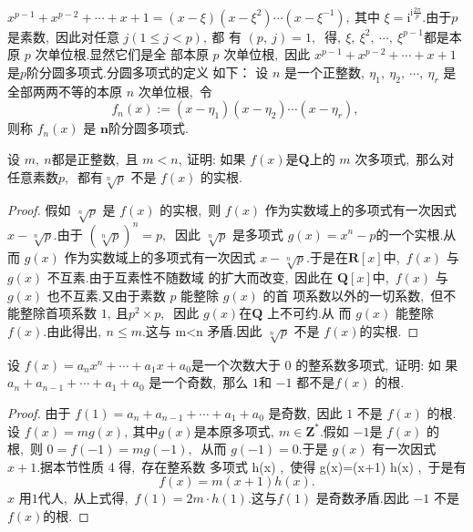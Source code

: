\begin{note}
	$x^{p-1}+x^{p-2}+\cdots+   x+1=(x-\xi)\left(x-\xi^{2}\right) \cdots\left(x-\xi^{-1}\right) ,\  $其中  $\xi=\mathrm{i}^{\mathrm{i} \frac{2 \pi}{p}}  .$由于$  p$  是素数,\  因此对任意 $ j(1 \leqslant j<p) ,\  $都 有 $ (p,\  j)=1 ,\  $ 得$,\   \xi,\  \xi^{2},\  \cdots,\  \xi^{p-1}  $都是本原 $ p$  次单位根.显然它们是全 部本原 $ p $ 次单位根,\  因此  $x^{p-1}+x^{p-2}+\cdots+x+1  $是$  p  $阶分圆多项式.分圆多项式的定义 如下：
	设 $ n$  是一个正整数$,\   \eta_{1},\  \eta_{2},\  \cdots,\  \eta_{r} $ 是全部两两不等的本原  $n $ 次单位根,\  令
	$$f_{n}(x):=\left(x-\eta_{1}\right)\left(x-\eta_{2}\right) \cdots\left(x-\eta_{r}\right),\ $$
	则称 $ f_{n}(x) $ 是 $ \boldsymbol{n}  $阶分圆多项式.
\end{note}
\newpage
\begin{problem}
	设 $ m,\  n  $都是正整数,\  且 $ m<n ,\  $证明: 如果  $f(x)  $是$  \mathbf{Q}  $上的  $m $ 次多项式,\  那么对 任意素数$  p ,\ $ 都有$  \sqrt[n]{p} $ 不是 $ f(x) $ 的实根.
\end{problem}
\begin{proof}
	假如  $\sqrt[n]{p} $ 是 $ f(x) $ 的实根,\  则  $f(x)$  作为实数域上的多项式有一次因式 $ x-\sqrt[n]{p}  . $由于  $(\sqrt[n]{p})^{n}=p ,\ $ 因此  $\sqrt[n]{p}$  是多项式 $ g(x)=x^{n}-p  $的一个实根.从而  $g(x)$  作为实数域上的多项式有一次因式 $ x-\sqrt[n]{p}  .$于是在$  \mathbf{R}[x]  $中,\   $f(x) $ 与  $g(x) $ 不互素.由于互素性不随数域 的扩大而改变,\  因此在  $\mathbf{Q}[x]  $中,\  $ f(x) $ 与 $ g(x) $ 也不互素.又由于素数  $p$  能整除 $ g(x) $ 的首 项系数以外的一切系数,\  但不能整除首项系数 $1 ,\  $且$  p^{2} \times p ,\ $ 因此 $ g(x)  $在$  \mathbf{Q}$  上不可约.从 而 $ g(x)$  能整除 $ f(x)  .$由此得出$,\   n \leqslant m  .$这与  m<n  矛盾.因此 $ \sqrt[n]{p} $ 不是  $f(x)  $的实根.
\end{proof}
\newpage
\begin{problem}
	设 $ f(x)=a_{n} x^{n}+\cdots+a_{1} x+a_{0}  $是一个次数大于 $0$ 的整系数多项式,\  证明: 如 果  $a_{n}+a_{n-1}+\cdots+a_{1}+a_{0} $ 是一个奇数,\ 那么 $1 $和 $ -1$  都不是$  f(x) $ 的根.
\end{problem}
\begin{proof}
	由于 $ f(1)=a_{n}+a_{n-1}+\cdots+a_{1}+a_{0} $ 是奇数,\ 因此 $1$ 不是 $ f(x) $ 的根.设  $f(x)   =m g(x) ,\  $其中$  g(x)  $是本原多项式$,\   m \in \mathbf{Z}^{*}  .$假如 $ -1  $是 $ f(x) $ 的根,\  则 $ 0=f(-1)=   m g(-1) ,\ $ 从而 $ g(-1)=0  .$于是 $ g(x) $ 有一次因式  $x+1  .$据本节性质 4 得,\  存在整系数 多项式  h(x) ,\  使得  g(x)=(x+1) h(x) ,\  于是有
	$$f(x)=m(x+1) h(x) .$$
	$x $ 用$ 1 $代人,\  从上式得,\   $f(1)=2 m \cdot h(1)  .$这与$  f(1) $ 是奇数矛盾.因此  $-1 $ 不是 $ f(x)  $的根.
\end{proof}
